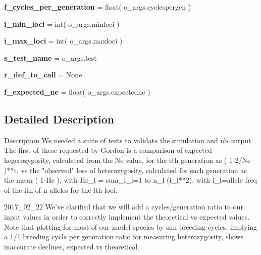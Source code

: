 \begin{DoxyCompactItemize}
\item 
{\bfseries f\+\_\+cycles\+\_\+per\+\_\+generation} = float( o\+\_\+args.\+cyclespergen )\hypertarget{namespacenegui_1_1pgvalidationtests_a781c5738c4ccd5a03bd839107f37c125}{}\label{namespacenegui_1_1pgvalidationtests_a781c5738c4ccd5a03bd839107f37c125}

\item 
{\bfseries i\+\_\+min\+\_\+loci} = int( o\+\_\+args.\+minloci )\hypertarget{namespacenegui_1_1pgvalidationtests_a49c9edded3d6f6d48210e7b10dd44dd5}{}\label{namespacenegui_1_1pgvalidationtests_a49c9edded3d6f6d48210e7b10dd44dd5}

\item 
{\bfseries i\+\_\+max\+\_\+loci} = int( o\+\_\+args.\+maxloci )\hypertarget{namespacenegui_1_1pgvalidationtests_aec1b97b9559a116c069a261a1415a6b1}{}\label{namespacenegui_1_1pgvalidationtests_aec1b97b9559a116c069a261a1415a6b1}

\item 
{\bfseries s\+\_\+test\+\_\+name} = o\+\_\+args.\+test\hypertarget{namespacenegui_1_1pgvalidationtests_a928c5205a2f691d2d8134347d800ef52}{}\label{namespacenegui_1_1pgvalidationtests_a928c5205a2f691d2d8134347d800ef52}

\item 
{\bfseries r\+\_\+def\+\_\+to\+\_\+call} = None\hypertarget{namespacenegui_1_1pgvalidationtests_a668820c5f2187a6b9551fcd4d0c7dead}{}\label{namespacenegui_1_1pgvalidationtests_a668820c5f2187a6b9551fcd4d0c7dead}

\item 
{\bfseries f\+\_\+expected\+\_\+ne} = float( o\+\_\+args.\+expectedne )\hypertarget{namespacenegui_1_1pgvalidationtests_a33b6dbdb04d536afef35d90800e0c307}{}\label{namespacenegui_1_1pgvalidationtests_a33b6dbdb04d536afef35d90800e0c307}

\end{DoxyCompactItemize}


\subsection{Detailed Description}
\begin{DoxyVerb}Description
We needed a suite of tests to validate the simulation and nb output.  
The first of these requested by Gordon is a comparison of expected
hegerozygosity, calculated from the Ne value, for the tth generation
as ( 1-2/Ne )**t, vs  the "observed" 
loss of heterozygosity, calculated for each generation as the mean ( 1-He ), with
He_l = sum_i_l=1 to n_l (i_l**2), with i_l=allele freq of the ith of n alleles 
for the lth loci.


2017_02_22
We've clarified that we will add a cycles/generation ratio to our input values
in order to correctly implement the theoretical vs expected values. Note that
plotting for most of our model species by sim breeding cycles, implying a 1/1
breeding cycle per generation ratio for measuring heterozygosity, shows 
inaccurate declines, expected vs theoretical.
\end{DoxyVerb}
 

